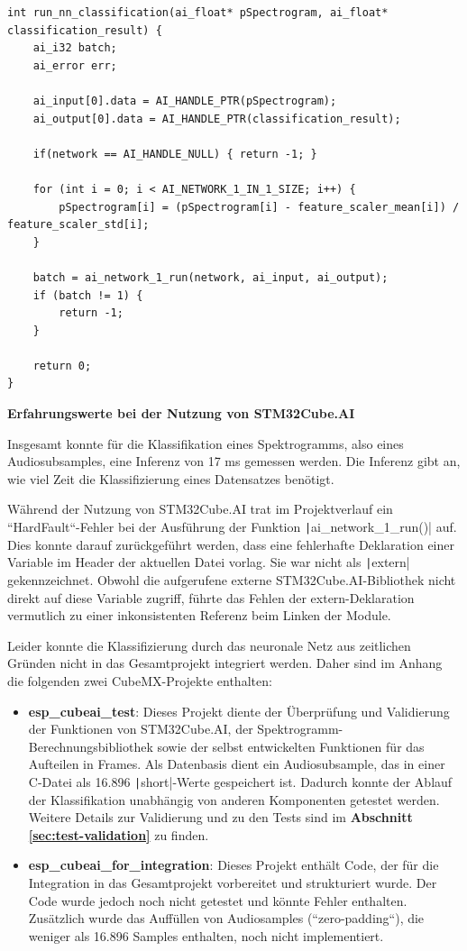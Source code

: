 \begin{verbatim}
int run_nn_classification(ai_float* pSpectrogram, ai_float* classification_result) {
    ai_i32 batch;
    ai_error err;

    ai_input[0].data = AI_HANDLE_PTR(pSpectrogram);
    ai_output[0].data = AI_HANDLE_PTR(classification_result);

    if(network == AI_HANDLE_NULL) { return -1; }

    for (int i = 0; i < AI_NETWORK_1_IN_1_SIZE; i++) {
    	pSpectrogram[i] = (pSpectrogram[i] - feature_scaler_mean[i]) / feature_scaler_std[i];
    }

    batch = ai_network_1_run(network, ai_input, ai_output);
    if (batch != 1) {
        return -1;
    }

    return 0;
}

\end{verbatim}

\textbf{Erfahrungswerte bei der Nutzung von STM32Cube.AI}

Insgesamt konnte für die Klassifikation eines Spektrogramms, also eines Audiosubsamples, eine Inferenz von 17 ms gemessen werden. Die Inferenz gibt an, wie viel Zeit die Klassifizierung eines Datensatzes benötigt.

Während der Nutzung von STM32Cube.AI trat im Projektverlauf ein ``HardFault``-Fehler bei der Ausführung der Funktion \texttt|ai_network_1_run()| auf. Dies konnte darauf zurückgeführt werden, dass eine fehlerhafte Deklaration einer Variable im Header der aktuellen Datei vorlag. Sie war nicht als \texttt|extern| gekennzeichnet. Obwohl die aufgerufene externe STM32Cube.AI-Bibliothek nicht direkt auf diese Variable zugriff, führte das Fehlen der extern-Deklaration vermutlich zu einer inkonsistenten Referenz beim Linken der Module.

Leider konnte die Klassifizierung durch das neuronale Netz aus zeitlichen Gründen nicht in das Gesamtprojekt integriert werden. Daher sind im Anhang die folgenden zwei CubeMX-Projekte enthalten:

\begin{itemize}
\item \textbf{esp\_cubeai\_test}: Dieses Projekt diente der Überprüfung und Validierung der Funktionen von STM32Cube.AI, der Spektrogramm-Berechnungsbibliothek sowie der selbst entwickelten Funktionen für das Aufteilen in Frames. Als Datenbasis dient ein Audiosubsample, das in einer C-Datei als 16.896 \texttt|short|-Werte gespeichert ist. Dadurch konnte der Ablauf der Klassifikation unabhängig von anderen Komponenten getestet werden. Weitere Details zur Validierung und zu den Tests sind im \textbf{Abschnitt \ref{sec:test-validation}} zu finden.
\item \textbf{esp\_cubeai\_for\_integration}: Dieses Projekt enthält Code, der für die Integration in das Gesamtprojekt vorbereitet und strukturiert wurde. Der Code wurde jedoch noch nicht getestet und könnte Fehler enthalten. Zusätzlich wurde das Auffüllen von Audiosamples (``zero-padding``), die weniger als 16.896 Samples enthalten, noch nicht implementiert.
\end{itemize}

